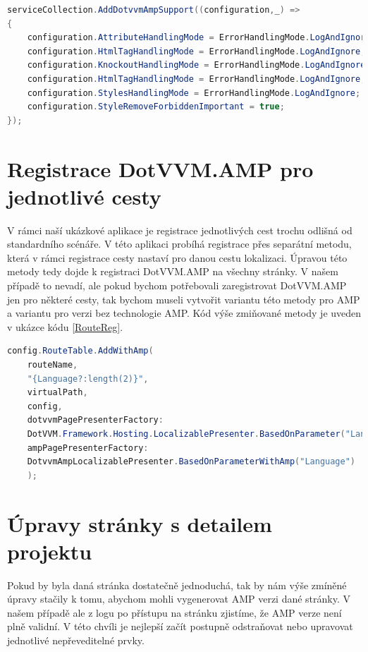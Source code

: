 \begin{lstlisting}[language=c#, caption=Ukázka možné AMP konfigurace,label=AmpConfig,captionpos=t]
serviceCollection.AddDotvvmAmpSupport((configuration,_) =>
{
	configuration.AttributeHandlingMode = ErrorHandlingMode.LogAndIgnore;
	configuration.HtmlTagHandlingMode = ErrorHandlingMode.LogAndIgnore;
	configuration.KnockoutHandlingMode = ErrorHandlingMode.LogAndIgnore;
	configuration.HtmlTagHandlingMode = ErrorHandlingMode.LogAndIgnore;
	configuration.StylesHandlingMode = ErrorHandlingMode.LogAndIgnore;
	configuration.StyleRemoveForbiddenImportant = true;
});
\end{lstlisting}

\section{Registrace DotVVM.AMP pro jednotlivé cesty}
V rámci naší ukázkové aplikace je registrace jednotlivých cest trochu odlišná od standardního scénáře. V této aplikaci probíhá registrace přes separátní metodu, která v rámci registrace cesty nastaví pro danou cestu lokalizaci. Úpravou této metody tedy dojde k registraci DotVVM.AMP na všechny stránky. V našem případě to nevadí, ale pokud bychom potřebovali zaregistrovat DotVVM.AMP jen pro některé cesty, tak bychom museli vytvořit variantu této metody pro AMP a variantu pro verzi bez technologie AMP. Kód výše zmiňované metody je uveden v ukázce kódu \ref{RouteReg}. 
\begin{lstlisting}[language=c#, caption=Registrace cesty s DotVVM.AMP,label=RouteReg,captionpos=t]
config.RouteTable.AddWithAmp(
	routeName,
	"{Language?:length(2)}",
	virtualPath,
	config,
	dotvvmPagePresenterFactory:
	DotVVM.Framework.Hosting.LocalizablePresenter.BasedOnParameter("Language"),
	ampPagePresenterFactory:
	DotvvmAmpLocalizablePresenter.BasedOnParameterWithAmp("Language")
	);

\end{lstlisting}

\section{Úpravy stránky s detailem projektu}
Pokud by byla daná stránka dostatečně jednoduchá, tak by nám výše zmíněné úpravy stačily k tomu, abychom mohli vygenerovat AMP verzi dané stránky. V našem případě ale z logu po přístupu na stránku zjistíme, že AMP verze není plně validní. V této chvíli je nejlepší začít postupně odstraňovat nebo upravovat jednotlivé nepřeveditelné prvky.


